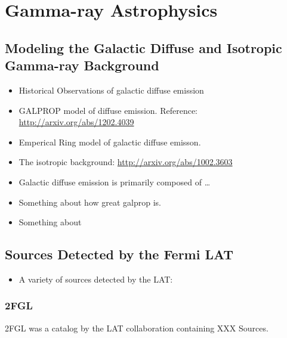 
\chapter{Gamma-ray Astrophysics}






\section{Modeling the Galactic Diffuse and Isotropic Gamma-ray Background}

\begin{itemize}
  \item Historical Observations of galactic diffuse emission
  \item GALPROP model of diffuse emission.
  Reference: \url{http://arxiv.org/abs/1202.4039}
  \item Emperical Ring model of galactic diffuse emisson.
  \item The isotropic background: \url{http://arxiv.org/abs/1002.3603}
\end{itemize}

\begin{itemize}
  \item Galactic diffuse emission is primarily composed of \ldots
  \item Something about how great galprop is.
  \item Something about
\end{itemize}

\section{Sources Detected by the Fermi \acs{LAT}}

\begin{itemize}
  \item A variety of sources detected by the \acs{LAT}:
\end{itemize}

\subsection{\acf{2FGL}}

\ac{2FGL} was a catalog by the LAT collaboration containing XXX Sources.

